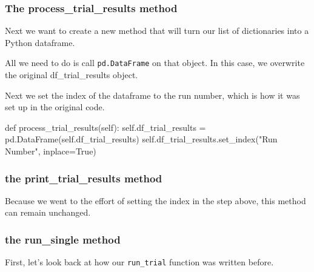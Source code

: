 \documentclass[
  letterpaper,
  DIV=11,
  numbers=noendperiod]{scrreprt}
\newenvironment{Shaded}{\begin{snugshade}}{\end{snugshade}}
\newcommand{\KeywordTok}[1]{\textcolor[rgb]{0.00,0.23,0.31}{#1}}
\newcommand{\NormalTok}[1]{\textcolor[rgb]{0.00,0.23,0.31}{#1}}
\newcommand{\OperatorTok}[1]{\textcolor[rgb]{0.37,0.37,0.37}{#1}}
\newcommand{\StringTok}[1]{\textcolor[rgb]{0.13,0.47,0.30}{#1}}
\newcommand{\VariableTok}[1]{\textcolor[rgb]{0.07,0.07,0.07}{#1}}
\begin{document}
\subsubsection{The process\_trial\_results
method}\label{the-process_trial_results-method}

Next we want to create a new method that will turn our list of
dictionaries into a Python dataframe.

All we need to do is call \texttt{pd.DataFrame} on that object. In this
case, we overwrite the original df\_trial\_results object.

Next we set the index of the dataframe to the run number, which is how
it was set up in the original code.

\begin{Shaded}
\begin{Highlighting}[]
\KeywordTok{def}\NormalTok{ process\_trial\_results(}\VariableTok{self}\NormalTok{):}
  \VariableTok{self}\NormalTok{.df\_trial\_results }\OperatorTok{=}\NormalTok{ pd.DataFrame(}\VariableTok{self}\NormalTok{.df\_trial\_results)}
  \VariableTok{self}\NormalTok{.df\_trial\_results.set\_index(}\StringTok{"Run Number"}\NormalTok{, inplace}\OperatorTok{=}\VariableTok{True}\NormalTok{)}
\end{Highlighting}
\end{Shaded}

\subsubsection{the print\_trial\_results
method}\label{the-print_trial_results-method-2}

Because we went to the effort of setting the index in the step above,
this method can remain unchanged.

\subsubsection{the run\_single method}\label{the-run_single-method}

First, let's look back at how our \texttt{run\_trial} function was
written before.
\end{document}
